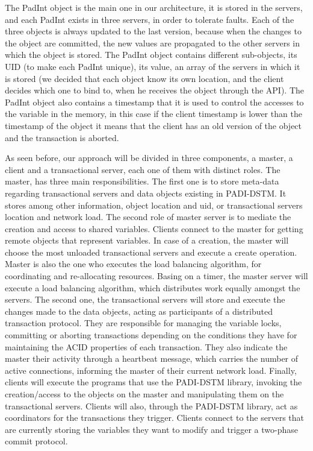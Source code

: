 \documentclass[times, 10pt,twocolumn]{article}
\begin{document}
The PadInt object is the main one in our architecture, it is stored in the servers, and each PadInt exists in three servers, in order to tolerate faults. Each of the three objects is always updated to the last version, because when the changes to the object are committed, the new values are propagated to the other servers in which the object is stored. The PadInt object contains different sub-objects, its UID (to make each PadInt unique), its value, an array of the servers in which it is stored (we decided that each object know its own location, and the client decides which one to bind to, when he receives the object through the API). The PadInt object also contains a timestamp that it is used to control the accesses to the variable in the memory, in this case if the client timestamp is lower than the timestamp of the object it means that the client has an old version of the object and the transaction is aborted.


As seen before, our approach will be divided in three components, a master, a client and a transactional server, each one of them with distinct roles.
The master, has three main responsibilities. The first one is to store meta-data regarding transactional servers and data objects existing in PADI-DSTM. It stores among other information, object location and uid, or transactional servers location and network load. The second role of master server is to mediate the creation and access to shared variables. Clients connect to the master for getting remote objects that represent variables. In case of a creation, the master will choose the most unloaded transactional servers and  execute a create operation. Master is also the one who executes the load balancing algorithm, for coordinating and re-allocating resources. Basing on a timer, the master server will execute a load balancing algorithm, which distributes work equally amongst the servers.
The second one, the transactional servers will store and execute the changes made to the data objects, acting as participants of a distributed transaction protocol. They are responsible for managing the variable locks, committing or aborting transactions depending on the conditions they have for maintaining the ACID properties of each transaction. They also indicate the master their activity through a heartbeat message, which carries the number of active connections, informing the master of their current network load.  
Finally, clients will execute the programs that use the PADI-DSTM library, invoking the creation/access to the objects on the master and manipulating them on the transactional servers. Clients will also, through the PADI-DSTM library, act as coordinators for the transactions they trigger. Clients connect to the servers that are currently storing the variables they want to modify and trigger a two-phase commit protocol.
\end{document}
